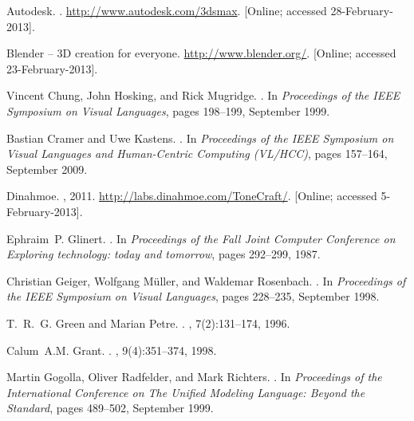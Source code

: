 \documentclass[a4paper]{article}
\begin{document}
\begin{thebibliography}{GMR98}

Autodesk.
.
\newblock \url{http://www.autodesk.com/3dsmax}. [Online; accessed
  28-February-2013].

{Blender -- 3D creation for everyone}.
\newblock \url{http://www.blender.org/}. [Online; accessed 23-February-2013].

Vincent Chung, John Hosking, and Rick Mugridge.
.
\newblock In {\em Proceedings of the IEEE Symposium on Visual Languages}, pages
  198--199, September 1999.

Bastian Cramer and Uwe Kastens.
.
\newblock In {\em Proceedings of the IEEE Symposium on Visual Languages and
  Human-Centric Computing (VL/HCC)}, pages 157--164, September 2009.

Dinahmoe.
, 2011.
\newblock \url{http://labs.dinahmoe.com/ToneCraft/}. [Online; accessed
  5-February-2013].

Ephraim~P. Glinert.
.
\newblock In {\em Proceedings of the Fall Joint Computer Conference on
  Exploring technology: today and tomorrow}, pages 292--299, 1987.

Christian Geiger, Wolfgang M\"{u}ller, and Waldemar Rosenbach.
.
\newblock In {\em Proceedings of the IEEE Symposium on Visual Languages}, pages
  228--235, September 1998.

T.~R.~G. Green and Marian Petre.
.
, 7(2):131--174, 1996.

Calum~A.M. Grant.
.
, 9(4):351--374, 1998.

Martin Gogolla, Oliver Radfelder, and Mark Richters.
.
\newblock In {\em Proceedings of the International Conference on The Unified
  Modeling Language: Beyond the Standard}, pages 489--502, September 1999.


\end{thebibliography}
\end{document}
